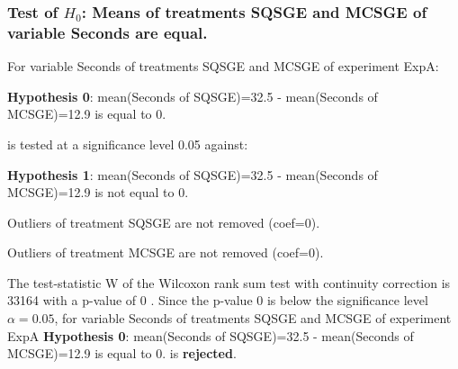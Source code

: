 \begin{frame}[t]
 \frametitle{Test of $H_{0}$: Means of treatments SQSGE and MCSGE of variable Seconds are equal. }
 \scriptsize
 For variable Seconds of treatments SQSGE and MCSGE of experiment ExpA:

\vspace{1mm}
{\bf Hypothesis 0}: mean(Seconds of SQSGE)=32.5 - mean(Seconds of MCSGE)=12.9 is equal to 0.


 \begin{center} is tested at a significance level 0.05 against: \end{center}

{\bf Hypothesis 1}: mean(Seconds of SQSGE)=32.5 - mean(Seconds of MCSGE)=12.9 is not equal to 0.
\vspace{1mm}
\vspace{1mm}

 Outliers of treatment SQSGE  are not removed (coef=0).

 Outliers of treatment MCSGE  are not removed (coef=0).
\vspace{1mm}
 
 The test-statistic W of the Wilcoxon rank sum test with continuity correction is 33164 with a p-value of 0 .
 Since the p-value 0 is below the significance level $\alpha= 0.05 $,
 for variable Seconds of treatments SQSGE and MCSGE of experiment ExpA 
 {\bf Hypothesis 0}: mean(Seconds of SQSGE)=32.5 - mean(Seconds of MCSGE)=12.9 is equal to 0.
is {\bf rejected}.

 \end{frame}
